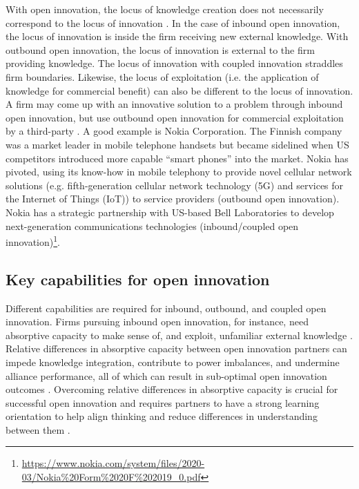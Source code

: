 With open innovation, the locus of knowledge creation does not necessarily correspond to the locus of innovation \citep{gassmann2004towards}. In the case of inbound open innovation, the locus of innovation is inside the firm receiving new external knowledge. With outbound open innovation, the locus of innovation is external to the firm providing knowledge. The locus of innovation with coupled innovation straddles firm boundaries. Likewise, the locus of exploitation (i.e. the application of knowledge for commercial benefit) can also be different to the locus of innovation. A firm may come up with an innovative solution to a problem through inbound open innovation, but use outbound open innovation for commercial exploitation by a third-party \citep{gassmann2004towards}. A good example is Nokia Corporation. The Finnish company was a market leader in mobile telephone handsets but became sidelined when US competitors introduced more capable \enquote{smart phones} into the market. Nokia has pivoted, using its know-how in mobile telephony to provide novel cellular network solutions (e.g. fifth-generation cellular network technology (5G) and services for the Internet of Things (IoT)) to service providers (outbound open innovation). Nokia has a strategic partnership with US-based Bell Laboratories to develop next-generation communications technologies (inbound/coupled open innovation)\footnote{\url{https://www.nokia.com/system/files/2020-03/Nokia\%20Form\%2020F\%202019_0.pdf}}.  
 
\subsection{Key capabilities for open innovation}

Different capabilities are required for inbound, outbound, and coupled open innovation. Firms pursuing inbound open innovation, for instance, need absorptive capacity to make sense of, and exploit, unfamiliar external knowledge  \citep{vanhaverbeke2007connecting}. Relative differences in absorptive capacity between open innovation partners can impede knowledge integration, contribute to power imbalances, and undermine alliance performance, all of which can result in sub-optimal open innovation outcomes \citep{lane1998relative,vanhaverbeke2007connecting,zobel2016benefiting,tell2017managing}. Overcoming relative differences in absorptive capacity is crucial for successful open innovation and requires partners to have a strong learning orientation to help align thinking and reduce differences in understanding between them  \citep{nooteboom2000learning,sun2010examination,de2016knowledge}. \medskip

